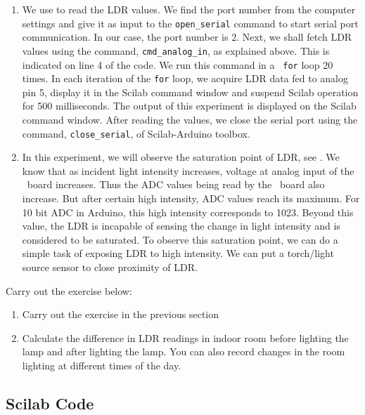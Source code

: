 \begin{enumerate}
\item We use  to read the LDR values.  We find the
  port number from the computer settings and give it as input to the
  {\tt open\_serial} command to start serial port communication. In
  our case, the port number is 2. Next, we shall fetch LDR values
  using the command, {\tt cmd\_analog\_in}, as explained above. This
  is indicated on line 4 of the code. We run this command in a {\tt
    for} loop 20 times. In each iteration of the {\tt for} loop, we
  acquire LDR data fed to analog pin 5, display it in the Scilab
  command window and suspend Scilab operation for 500
  milliseconds. The output of this experiment is displayed on the Scilab command
  window. After reading the values, we close the serial port using the
  command, {\tt close\_serial}, of Scilab-Arduino toolbox.

\item In this experiment, we will observe the saturation point of LDR,
  see .  We know that as incident light intensity
  increases, voltage at analog input of the \arduino\ board
  increases. Thus the ADC values being read by the \arduino\ board also
  increase. But after certain high intensity, ADC values reach its
  maximum. For 10 bit ADC in Arduino, this high intensity corresponds
  to 1023.  Beyond this value, the LDR is incapable of sensing the
  change in light intensity and is considered to be saturated. To
  observe this saturation point, we can do a simple task of exposing
  LDR to high intensity. We can put a torch/light source sensor to
  close proximity of LDR.
\end{enumerate}

\begin{exercise}
Carry out the exercise below:
\begin{enumerate}
\item Carry out the exercise in the previous section
\item Calculate the difference in LDR readings in indoor room
  before lighting the lamp and after lighting the lamp. You can also
  record changes in the room lighting at different times of the day.
\end{enumerate}
\end{exercise}

\subsection{Scilab Code}
\label{sec:ldr-scilab-code}

